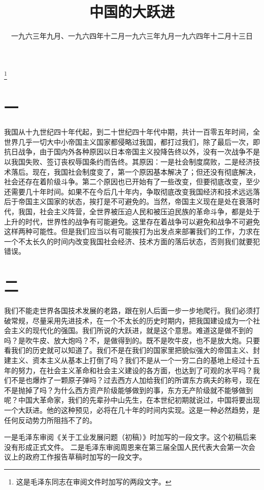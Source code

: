 
\title{中国的大跃进}
\date{一九六三年九月、一九六四年十二月}
\thanks{这是毛泽东同志在审阅文件时加写的两段文字。}
\maketitle

\date{一九六三年九月}
\section*{一}

我国从十九世纪四十年代起，到二十世纪四十年代中期，共计一百零五年时间，全世界几乎一切大中小帝国主义国家都侵略过我国，都打过我们，除了最后一次，即抗日战争，由于国内外各种原因以日本帝国主义投降告终以外，没有一次战争不是以我国失败、签订丧权辱国条约而告终。其原因：一是社会制度腐败，二是经济技术落后。现在，我国社会制度变了，第一个原因基本解决了；但还没有彻底解决，社会还存在着阶级斗争。第二个原因也已开始有了一些改变，但要彻底改变，至少还需要几十年时间。如果不在今后几十年内，争取彻底改变我国经济和技术远远落后于帝国主义国家的状态，挨打是不可避免的。当然，帝国主义现在是处在衰落时代，我国，社会主义阵营，全世界被压迫人民和被压迫民族的革命斗争，都是处于上升的时代，世界性的战争有可能避免。这里存在着战争可以避免和战争不可避免这样两种可能性。但是我们应当以有可能挨打为出发点来部署我们的工作，力求在一个不太长久的时间内改变我国社会经济、技术方面的落后状态，否则我们就要犯错误。


\date{一九六四年十二月十三日}
\section*{二}

我们不能走世界各国技术发展的老路，跟在别人后面一步一步地爬行。我们必须打破常规，尽量采用先进技术，在一个不太长的历史时期内，把我国建设成为一个社会主义的现代化的强国。我们所说的大跃进，就是这个意思。难道这是做不到的吗？是吹牛皮、放大炮吗？不，是做得到的。既不是吹牛皮，也不是放大炮。只要看我们的历史就可以知道了。我们不是在我们的国家里把貌似强大的帝国主义、封建主义、资本主义从基本上打倒了吗？我们不是从一个一穷二白的基地上经过十五年的努力，在社会主义革命和社会主义建设的各方面，也达到了可观的水平吗？我们不是也爆炸了一颗原子弹吗？过去西方人加给我们的所谓东方病夫的称号，现在不是抛掉了吗？为什么西方资产阶级能够做到的事，东方无产阶级就不能够做到呢？中国大革命家，我们的先辈孙中山先生，在本世纪初期就说过，中国将要出现一个大跃进。他的这种预见，必将在几十年的时间内实现。这是一种必然趋势，是任何反动势力所阻挡不了的。


\begin{maonote}
一是毛泽东审阅《关于工业发展问题（初稿）》时加写的一段文字。这个初稿后来没有形成正式文件。
二是毛泽东审阅周恩来在第三届全国人民代表大会第一次会议上的政府工作报告草稿时加写的一段文字。
\end{maonote}
